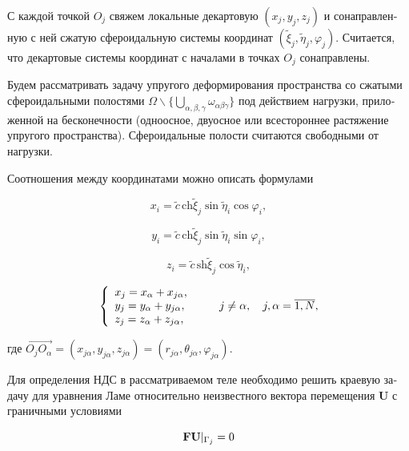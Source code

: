 \begin{russian}
С каждой точкой $O_j$ свяжем локальные декартовую $(x_j,y_j,z_j)$ и сонаправленную с ней сжатую сфероидальную системы координат $(\tilde\xi_j,\tilde\eta_j,\varphi_j)$. Считается, что декартовые системы координат с началами в точках $O_j$ сонаправлены.

Будем рассматривать задачу упругого деформирования пространства со сжатыми сфероидальными полостями $\Omega\backslash\bigg\{\bigcup\limits_{\alpha,\beta,\gamma}\omega_{\alpha\beta\gamma}\bigg\}$ под действием нагрузки, приложенной на бесконечности (одноосное, двуосное или всестороннее растяжение упругого пространства). Сфероидальные полости считаются свободными от нагрузки.

Соотношения между координатами можно описать формулами

\begin{equation*}
{x_i} = \tilde c\,\mathrm{ch}\tilde\xi_j\sin {\tilde\eta _i}\cos {\varphi _i},
\end{equation*}

\begin{equation}
{y_i} = \tilde c\,\mathrm{ch}\tilde\xi_j\sin {\tilde\eta _i}\sin {\varphi _i},
\label{eq:11:22k}
\end{equation}

\begin{equation*}
{z_i} = \tilde c\,\mathrm{sh}\tilde\xi_j\cos {\tilde\eta _i},
\end{equation*}

\begin{equation}
\left\{ {\begin{array}{*{20}{l}}
{{x_j} = {x_\alpha } + {x_{j\alpha }},}\\
{{y_j} = {y_\alpha } + {y_{j\alpha }},}\\
{{z_j} = {z_\alpha } + {z_{j\alpha }},}
\end{array}} \right.\qquad {\kern 1pt} j \ne \alpha ,\quad j,\alpha  = \overline {1,N},
\label{eq:11:23k}
\end{equation}

\noindent где $\overrightarrow {{O_j}{O_\alpha }}  = \left( {{x_{j\alpha }},{y_{j\alpha }},{z_{j\alpha }}} \right) = \left( {{r_{j\alpha }},{\theta _{j\alpha }},{\varphi _{j\alpha }}} \right)$.

Для определения НДС в рассматриваемом теле необходимо решить краевую задачу для уравнения Ламе относительно неизвестного вектора перемещения   $\mathbf{U}$ с граничными условиями

\begin{equation}
{\bf{FU}}{|_{{\Gamma _j}}} = 0
\end{equation}


\end{russian}
